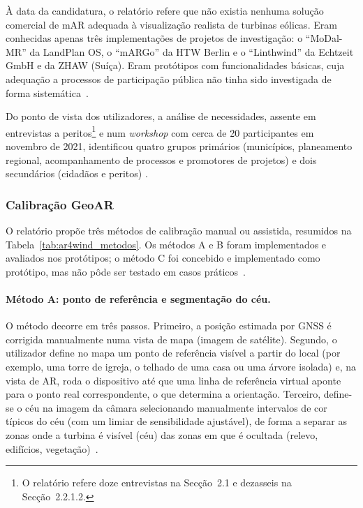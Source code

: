 À data da candidatura, o relatório refere que não existia nenhuma solução comercial de mAR adequada à visualização realista de turbinas eólicas. Eram conhecidas apenas três implementações de projetos de investigação: o ``MoDal-MR'' da LandPlan OS, o ``mARGo'' da HTW Berlin e o ``Linthwind'' da Echtzeit GmbH e da ZHAW (Suíça). Eram protótipos com funcionalidades básicas, cuja adequação a processos de participação pública não tinha sido investigada de forma sistemática~\cite[Sec.~1.2]{ar4wind2023}.

Do ponto de vista dos utilizadores, a análise de necessidades, assente em entrevistas a peritos\footnote{O relatório refere doze entrevistas na Secção~2.1 e dezasseis na Secção~2.2.1.2.} e num \textit{workshop} com cerca de 20 participantes em novembro de 2021, identificou quatro grupos primários (municípios, planeamento regional, acompanhamento de processos e promotores de projetos) e dois secundários (cidadãos e peritos) \cite[Sec.~2.1 e 2.2.1.2]{ar4wind2023}.

\subsubsection{Calibração GeoAR}
\label{sec:ar4wind_calibracao}

O relatório propõe três métodos de calibração manual ou assistida, resumidos na Tabela~\ref{tab:ar4wind_metodos}. Os métodos A e B foram implementados e avaliados nos protótipos; o método C foi concebido e implementado como protótipo, mas não pôde ser testado em casos práticos~\cite[Sec.~2.2.2.4]{ar4wind2023}.

\paragraph{Método A: ponto de referência e segmentação do céu.}
\label{sec:ar4wind_metodoA}
O método decorre em três passos. Primeiro, a posição estimada por GNSS é corrigida manualmente numa vista de mapa (imagem de satélite). Segundo, o utilizador define no mapa um ponto de referência visível a partir do local (por exemplo, uma torre de igreja, o telhado de uma casa ou uma árvore isolada) e, na vista de AR, roda o dispositivo até que uma linha de referência virtual aponte para o ponto real correspondente, o que determina a orientação. Terceiro, define-se o céu na imagem da câmara selecionando manualmente intervalos de cor típicos do céu (com um limiar de sensibilidade ajustável), de forma a separar as zonas onde a turbina é visível (céu) das zonas em que é ocultada (relevo, edifícios, vegetação)~\cite[Sec.~2.2.2.2 e 2.2.3.1]{ar4wind2023}.

